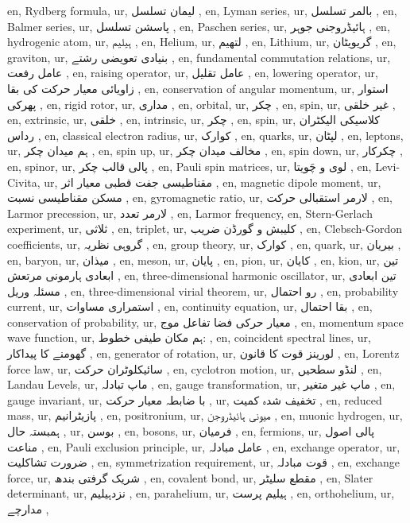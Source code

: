 en, Rydberg formula,
ur, لیمان تسلسل ,
en, Lyman series,
ur, بالمر تسلسل ,
en, Balmer series,
ur, پاسشن تسلسل ,
en, Paschen series,
ur, ہائیڈروجنی جوہر ,
en, hydrogenic atom,
ur,  ہیلیم ,
en, Helium,
ur, لتھیم  ,
en, Lithium,
ur, گریویٹان ,
en, graviton,
ur, بنیادی تعویضی رشتے  ,
en, fundamental commutation relations,
ur, عامل رفعت ,
en, raising operator,
ur, عامل تقلیل ,
en, lowering operator,
ur, زاویائی معیار حرکت کی بقا ,
en, conservation of angular momentum,
ur, استوار پھرکی ,
en, rigid rotor,
ur, مداری ,
en, orbital,
ur, چکر ,
en, spin,
ur, غیر خلقی ,
en, extrinsic,
ur, خلقی ,
en, intrinsic,
ur, چکر ,
en, spin,
ur, کلاسیکی الیکٹران رداس ,
en, classical electron radius,
ur, کوارک ,
en, quarks,
ur,  لپٹان ,
en, leptons,
ur, ہم میدان چکر ,
en, spin up,
ur, مخالف میدان چکر ,
en, spin down,
ur,  چکرکار ,
en, spinor,
ur, پالی قالب چکر ,
en, Pauli spin matrices,
ur, لوی و چَویتا ,
en, Levi-Civita,
ur, مقناطیسی جفت قطبی معیار اثر ,
en, magnetic dipole moment,
ur, مسکن مقناطیسی نسبت ,
en, gyromagnetic ratio,
ur, لارمر استقبالی حرکت ,
en, Larmor precession,
ur,  لارمر تعدد ,
en, Larmor frequency,
en, Stern-Gerlach experiment,
ur, ثلاثی ,
en, triplet,
ur, کلیبش و گورڈن ضریب  ,
en, Clebsch-Gordon coefficients,
ur, گروہی نظریہ ,
en, group theory,
ur, کوارک ,
en, quark,
ur, بیریان ,
en, baryon,
ur,  میذان ,
en, meson,
ur,  پایان ,
en, pion,
ur, کایان ,
en, kion,
ur, تین ابعادی ہارمونی مرتعش ,
en, three-dimensional harmonic oscillator,
ur, تین ابعادی مسئلہ وریل ,
en, three-dimensional virial theorem,
ur, رو احتمال ,
en, probability current,
ur, استمراری مساوات ,
en, continuity equation,
ur, بقا احتمال ,
en, conservation of probability,
ur, معیار حرکی فضا تفاعل موج ,
en, momentum space wave function,
ur, ہم مکان طیفی خطوط: ,
en, coincident spectral lines,
ur,  گھومنے کا پیداکار ,
en, generator of rotation,
ur, لورینز قوت کا قانون ,
en, Lorentz force law,
ur,  سائیکلوٹران حرکت ,
en, cyclotron motion,
ur, لنڈو سطحیں ,
en, Landau Levels,
ur, ماپ تبادلہ ,
en, gauge transformation,
ur, ماپ غیر متغیر ,
en, gauge invariant,
ur,  با ضابطہ معیار حرکت ,
ur, تخفیف شدہ کمیت ,
en, reduced mass,
ur, پازیٹرانیم ,
en, positronium,
ur, میونی ہائیڈروجن ,
en, muonic hydrogen,
ur,  ہمبستہ حال ,
ur,  بوسن ,
en, bosons,
ur, فرمیان ,
en, fermions,
ur, پالی اصول مناعت ,
en, Pauli exclusion principle,
ur, عامل مبادلہ ,
en, exchange operator,
ur,  ضرورت تشاکلیت ,
en, symmetrization requirement,
ur, قوت مبادلہ ,
en, exchange force,
ur, شریک گرفتی بندھ ,
en, covalent bond,
ur,  مقطع سلیٹر  ,
en, Slater determinant,
ur,  نزدہیلیم ,
en, parahelium,
ur,  ہیلیم پرست ,
en, orthohelium,
ur,  مدارچے ,
